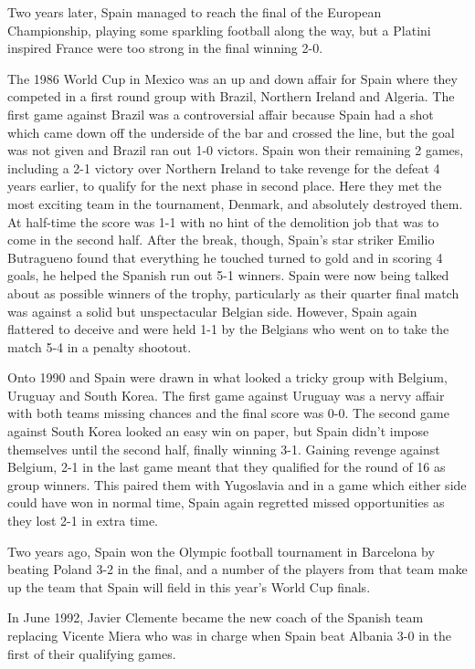 Two years later, Spain managed to reach the final of the European Championship,
playing some sparkling football along the way, but a Platini inspired France 
were too strong in the final winning 2-0.

The 1986 World Cup in Mexico was an up and down affair for Spain where they 
competed in a first round group with Brazil, Northern Ireland and Algeria. The
first game against Brazil was a controversial affair because Spain had a shot
which came down off the underside of the bar and crossed the line, but the goal
was not given and Brazil ran out 1-0 victors. Spain won their remaining 2 
games, including a 2-1 victory over Northern Ireland to take revenge for the 
defeat 4 years earlier, to qualify for the next phase in second place. Here 
they met the most exciting team in the tournament, Denmark, and absolutely
destroyed them. At half-time the score was 1-1 with no hint of the demolition
job that was to come in the second half. After the break, though, Spain's star
striker Emilio Butragueno found that everything he touched turned to gold and 
in scoring 4 goals, he helped the Spanish run out 5-1 winners. Spain were now 
being talked about as possible winners of the trophy, particularly as their 
quarter final match was against a solid but unspectacular Belgian side. 
However, Spain again flattered to deceive and were held 1-1 by the Belgians who
went on to take the match 5-4 in a penalty shootout.

Onto 1990 and Spain were drawn in what looked a tricky group with Belgium, 
Uruguay and South Korea. The first game against Uruguay was a nervy affair with
both teams missing chances and the final score was 0-0. The second game against
South Korea looked an easy win on paper, but Spain didn't impose themselves 
until the second half, finally winning 3-1. Gaining revenge against Belgium, 
2-1 in the last game meant that they qualified for the round of 16 as group
winners. This paired them with Yugoslavia and in a game which either side could
have won in normal time, Spain again regretted missed opportunities as they 
lost 2-1 in extra time.

Two years ago, Spain won the Olympic football tournament in Barcelona by 
beating Poland 3-2 in the final, and a number of the players from that team 
make up the team that Spain will field in this year's World Cup finals.

In June 1992, Javier Clemente became the new coach of the Spanish team 
replacing Vicente Miera who was in charge when Spain beat Albania 3-0 in the
first of their qualifying games. 

